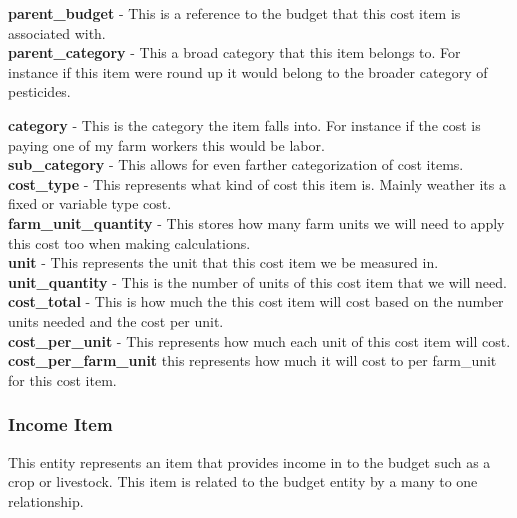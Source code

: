 \documentclass[onecolumn, draftclsnofoot,10pt, compsoc]{article}
\begin{document}
				\textbf{parent\_budget} - This is a reference to the budget that this cost item is associated with.\\

				\textbf{parent\_category} - This a broad category that this item belongs to. For instance if this item were round up it would belong to the broader category of pesticides.

				\textbf{category} - This is the category the item falls into. For instance if the cost is paying one of my farm workers this would be labor.\\

				\textbf{sub\_category} - This allows for even farther categorization of cost items.\\

				\textbf{cost\_type} - This represents what kind of cost this item is. Mainly weather its a fixed or variable type cost.\\

				\textbf{farm\_unit\_quantity} - This stores how many farm units we will need to apply this cost too when making calculations.\\

				\textbf{unit} - This represents the unit that this cost item we be measured in.\\

				\textbf{unit\_quantity} - This is the number of units of this cost item that we will need.\\

				\textbf{cost\_total} - This is how much the this cost item will cost based on the number units needed and the cost per unit.\\

				\textbf{cost\_per\_unit} - This represents how much each unit of this cost item will cost.\\

				\textbf{cost\_per\_farm\_unit} \- this represents how much it will cost to per farm\_unit for this cost item.\\

			\subsubsection{Income Item}
					This entity represents an item that provides income in to the budget such as a crop or livestock. This item is related to the budget entity by a many to one relationship.\\
\end{document}

